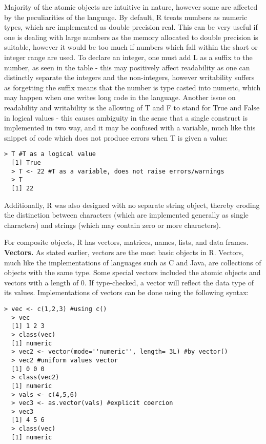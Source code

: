 \documentclass[12pt]{article}
\begin{document}
Majority of the atomic objects are intuitive in nature, however some are affected by the peculiarities of the language. By default, R treats numbers as numeric types, which are implemented as double precision real. This can be very useful if one is dealing with large numbers as the memory allocated to double precision is suitable, however it would be too much if numbers which fall within the short or integer range are used. To declare an integer, one must add L as a suffix to the number, as seen in the table - this may positively affect readability as one can distinctly separate the integers and the non-integers, however writability suffers as forgetting the suffix means that the number is type casted into numeric, which may happen when one writes long code in the language. Another issue on readability and writability is the allowing of T and F to stand for True and False in logical values - this causes ambiguity in the sense that a single construct is implemented in two way, and it may be confused with a variable, much like this snippet of code which does not produce errors when T is given a value:

\begin{lstlisting}[frame=single]
  > T #T as a logical value
  [1] True
  > T <- 22 #T as a variable, does not raise errors/warnings
  > T
  [1] 22
\end{lstlisting}

Additionally, R was also designed with no separate string object, thereby eroding the distinction between characters (which are implemented generally as single characters) and strings (which may contain zero or more characters).

For composite objects, R has vectors, matrices, names, lists, and data frames. \\

\textbf{Vectors.} As stated earlier, vectors are the most basic objects in R. Vectors, much like the implementations of languages such as C and Java, are collections of objects with the same type. Some special vectors included the atomic objects and vectors with a length of 0. If type-checked, a vector will reflect the data type of its values. Implementations of vectors can be done using the following syntax:

\begin{lstlisting}[frame=single]
  > vec <- c(1,2,3) #using c()
  > vec
  [1] 1 2 3
  > class(vec)
  [1] numeric
  > vec2 <- vector(mode=''numeric'', length= 3L) #by vector()
  > vec2 #uniform values vector
  [1] 0 0 0
  > class(vec2)
  [1] numeric
  > vals <- c(4,5,6)
  > vec3 <- as.vector(vals) #explicit coercion
  > vec3
  [1] 4 5 6
  > class(vec)
  [1] numeric
\end{lstlisting}
\end{document}

